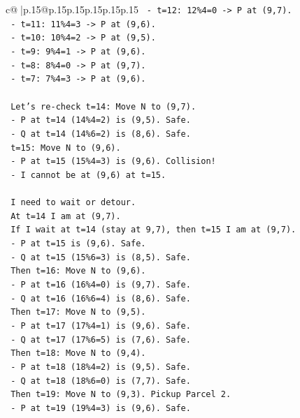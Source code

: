 \documentclass{article}
\begin{document}
{\begin{supertabular}{c@{$\;$}|p{.15\linewidth}@{}p{.15\linewidth}p{.15\linewidth}p{.15\linewidth}p{.15\linewidth}p{.15\linewidth}}
{{{\texttt{  {-} t=12: 12\%4=0 {-}> P at (9,7).} \\
\texttt{  {-} t=11: 11\%4=3 {-}> P at (9,6).} \\
\texttt{  {-} t=10: 10\%4=2 {-}> P at (9,5).} \\
\texttt{  {-} t=9: 9\%4=1 {-}> P at (9,6).} \\
\texttt{  {-} t=8: 8\%4=0 {-}> P at (9,7).} \\
\texttt{  {-} t=7: 7\%4=3 {-}> P at (9,6).} \\
\\ 
\texttt{  Let's re{-}check t=14: Move N to (9,7).} \\
\texttt{  {-} P at t=14 (14\%4=2) is (9,5). Safe.} \\
\texttt{  {-} Q at t=14 (14\%6=2) is (8,6). Safe.} \\
\texttt{  t=15: Move N to (9,6).} \\
\texttt{  {-} P at t=15 (15\%4=3) is (9,6). Collision!} \\
\texttt{  {-} I cannot be at (9,6) at t=15.} \\
\\ 
\texttt{  I need to wait or detour.} \\
\texttt{  At t=14 I am at (9,7).} \\
\texttt{  If I wait at t=14 (stay at 9,7), then t=15 I am at (9,7).} \\
\texttt{  {-} P at t=15 is (9,6). Safe.} \\
\texttt{  {-} Q at t=15 (15\%6=3) is (8,5). Safe.} \\
\texttt{  Then t=16: Move N to (9,6).} \\
\texttt{  {-} P at t=16 (16\%4=0) is (9,7). Safe.} \\
\texttt{  {-} Q at t=16 (16\%6=4) is (8,6). Safe.} \\
\texttt{  Then t=17: Move N to (9,5).} \\
\texttt{  {-} P at t=17 (17\%4=1) is (9,6). Safe.} \\
\texttt{  {-} Q at t=17 (17\%6=5) is (7,6). Safe.} \\
\texttt{  Then t=18: Move N to (9,4).} \\
\texttt{  {-} P at t=18 (18\%4=2) is (9,5). Safe.} \\
\texttt{  {-} Q at t=18 (18\%6=0) is (7,7). Safe.} \\
\texttt{  Then t=19: Move N to (9,3). Pickup Parcel 2.} \\
\texttt{  {-} P at t=19 (19\%4=3) is (9,6). Safe.} \\
}}}
\end{supertabular}}
\end{document}
